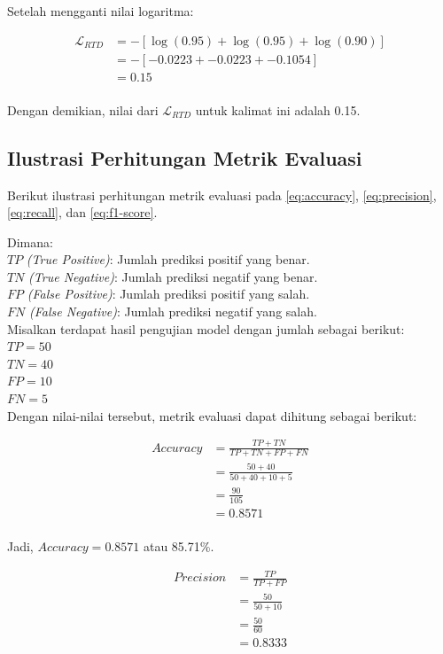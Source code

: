 Setelah mengganti nilai logaritma:

\begin{align*}
    \mathcal{L}_{RTD} &= - \left[ \log(0.95) + \log(0.95) + \log(0.90) \right] \\
    &= - \left[ -0.0223 + -0.0223 + -0.1054 \right] \\
    &= 0.15 \\
\end{align*}

Dengan demikian, nilai dari \(\mathcal{L}_{RTD}\) untuk kalimat ini adalah 0.15.

\subsection{Ilustrasi Perhitungan Metrik Evaluasi} \label{subsec:ilustrasi_perhitungan_metrik_evaluasi}

Berikut ilustrasi perhitungan metrik evaluasi pada \ref{eq:accuracy}, \ref{eq:precision}, \ref{eq:recall}, dan \ref{eq:f1-score}.

Dimana:\\
\(TP\) \textit{(True Positive)}: Jumlah prediksi positif yang benar.\\
\(TN\) \textit{(True Negative)}: Jumlah prediksi negatif yang benar.\\
\(FP\) \textit{(False Positive)}: Jumlah prediksi positif yang salah.\\
\(FN\) \textit{(False Negative)}: Jumlah prediksi negatif yang salah.\\
Misalkan terdapat hasil pengujian model dengan jumlah sebagai berikut:\\
\(TP = 50\)\\
\(TN = 40\)\\
\(FP = 10\)\\
\(FN = 5\)\\
Dengan nilai-nilai tersebut, metrik evaluasi dapat dihitung sebagai berikut:

\begin{align*}
    \textit{Accuracy} &= \frac{TP + TN}{TP + TN + FP + FN} \\
    &= \frac{50 + 40}{50 + 40 + 10 + 5} \\
    &= \frac{90}{105} \\
    &= 0.8571\\
\end{align*}

Jadi, \(\textit{Accuracy} = 0.8571\) atau 85.71\%.

\begin{align*}
    \textit{Precision} &= \frac{TP}{TP + FP} \\
    &= \frac{50}{50 + 10} \\
    &= \frac{50}{60} \\
    &= 0.8333\\
\end{align*}

